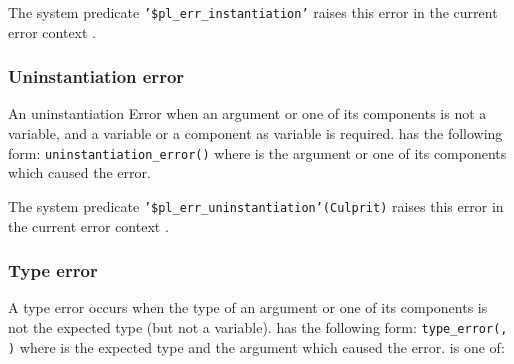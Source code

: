 The system predicate \texttt{'\$pl\_err\_instantiation'} raises this
error in the current error context .

\subsubsection{Uninstantiation error}
\label{Uninstantiation-error}
An uninstantiation Error when an argument or one of its components is not a
variable, and a variable or a component as variable is required.
 has the following form:
\texttt{uninstantiation\_error()} where  is the argument or one
of its components which caused the error.

The system predicate \texttt{'\$pl\_err\_uninstantiation'(Culprit)} raises this
error in the current error context .

\subsubsection{Type error}
\label{Type-error}
A type error occurs when the type of an argument or one of its components is
not the expected type (but not a variable).  has
the following form: \texttt{type\_error(, )} where
 is the expected type and 
the argument which caused the error.  is one of:

